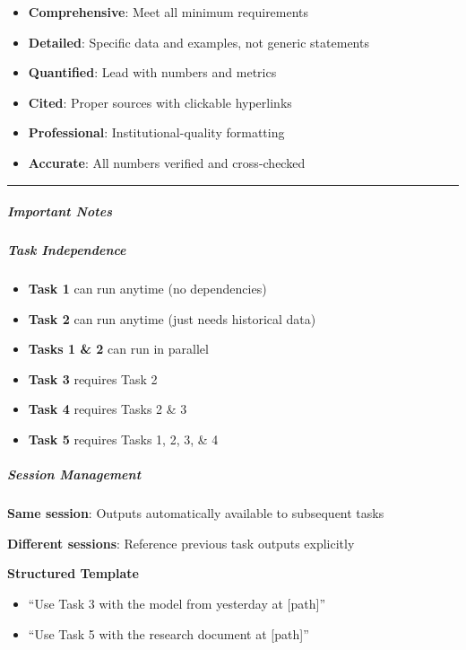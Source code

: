 \documentclass[11pt]{article}
\begin{document}
\begin{itemize}[leftmargin=*,itemsep=2pt,topsep=2pt]
\item {} \textbf{Comprehensive}: Meet all minimum requirements
\item {} \textbf{Detailed}: Specific data and examples, not generic statements
\item {} \textbf{Quantified}: Lead with numbers and metrics
\item {} \textbf{Cited}: Proper sources with clickable hyperlinks
\item {} \textbf{Professional}: Institutional-quality formatting
\item {} \textbf{Accurate}: All numbers verified and cross-checked
\end{itemize}

\vspace{0.5em}\hrule\vspace{0.5em}

\subparagraph{Important Notes}\mbox{}\par

\subparagraph{Task Independence}\mbox{}\par

\begin{itemize}[leftmargin=*,itemsep=2pt,topsep=2pt]
\item {} \textbf{Task 1} can run anytime (no dependencies)
\item {} \textbf{Task 2} can run anytime (just needs historical data)
\item {} \textbf{Tasks 1 \& 2} can run in parallel
\item {} \textbf{Task 3} requires Task 2
\item {} \textbf{Task 4} requires Tasks 2 \& 3
\item {} \textbf{Task 5} requires Tasks 1, 2, 3, \& 4
\end{itemize}

\subparagraph{Session Management}\mbox{}\par

\textbf{Same session}: Outputs automatically available to subsequent tasks


\textbf{Different sessions}: Reference previous task outputs explicitly

\textbf{Structured Template}
\begin{itemize}[leftmargin=*,itemsep=2pt,topsep=2pt]
\item {} ``Use Task 3 with the model from yesterday at [path]''
\item {} ``Use Task 5 with the research document at [path]''
\end{itemize}
\end{document}
